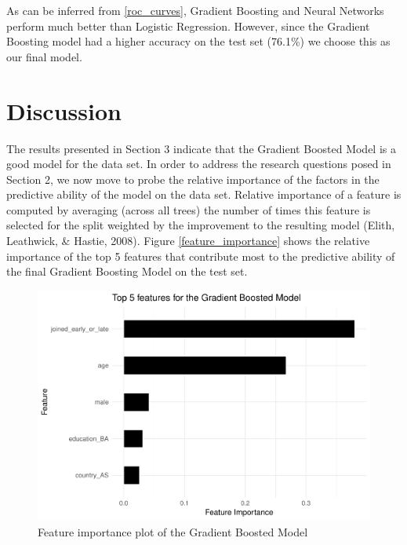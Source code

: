 \documentclass[12pt,]{article}
\begin{document}
As can be inferred from \ref{roc_curves}, Gradient Boosting and Neural
Networks perform much better than Logistic Regression. However, since
the Gradient Boosting model had a higher accuracy on the test set
(76.1\%) we choose this as our final model.

\section{Discussion}\label{discussion}

The results presented in Section 3 indicate that the Gradient Boosted
Model is a good model for the data set. In order to address the research
questions posed in Section 2, we now move to probe the relative
importance of the factors in the predictive ability of the model on the
data set. Relative importance of a feature is computed by averaging
(across all trees) the number of times this feature is selected for the
split weighted by the improvement to the resulting model (Elith,
Leathwick, \& Hastie, 2008). Figure \ref{feature_importance} shows the
relative importance of the top 5 features that contribute most to the
predictive ability of the final Gradient Boosting Model on the test set.

\begin{figure}[p]

{\centering \includegraphics[width=1\linewidth]{initial-draft_files/figure-latex/unnamed-chunk-8-1} 

}

\caption{Feature importance plot of the Gradient Boosted Model \label{feature_importance}}\label{fig:unnamed-chunk-8}
\end{figure}
\end{document}
